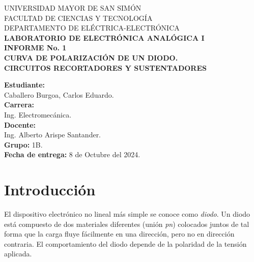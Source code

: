 \documentclass[letter,twoside,11pt]{article}
\begin{document}
\begin{titlepage}
    \begin{center}
        {\Large UNIVERSIDAD MAYOR DE SAN SIMÓN}\\
        \vspace*{0.15cm}
        {\large FACULTAD DE CIENCIAS Y TECNOLOGÍA}\\
        \vspace*{0.10cm}
        DEPARTAMENTO DE ELÉCTRICA-ELECTRÓNICA\\
        \vspace*{3.0cm}
        {\Large \textbf{LABORATORIO DE ELECTRÓNICA ANALÓGICA I}}\\
        \vspace*{0.3cm}
        {\Large \textbf{INFORME No. 1}}\\
        \vspace*{3.5cm}
        {\Large \textbf{CURVA DE POLARIZACIÓN DE UN DIODO.\\
        CIRCUITOS RECORTADORES Y SUSTENTADORES}}\\
    \end{center}

    \vspace*{5.8cm}
    \leftskip=7.95cm
    \noindent
    \textbf{Estudiante:}\\
    Caballero Burgoa, Carlos Eduardo.\\
    \newline
    \textbf{Carrera:}\\
    Ing. Electromecánica.\\
    \newline
    \textbf{Docente:}\\
    Ing. Alberto Arispe Santander.\\
    \newline
    \textbf{Grupo:} 1B.\\
    \textbf{Fecha de entrega:} 8 de Octubre del 2024.\\
\end{titlepage}

\section{Introducción}
El dispositivo electrónico no lineal más simple se conoce como \emph{diodo}. Un
diodo está compuesto de dos materiales diferentes (unión \emph{pn}) colocados
juntos de tal forma que la carga fluye fácilmente en una dirección, pero no en
dirección contraria. El comportamiento del diodo depende de la polaridad de la
tensión aplicada.
\end{document}
